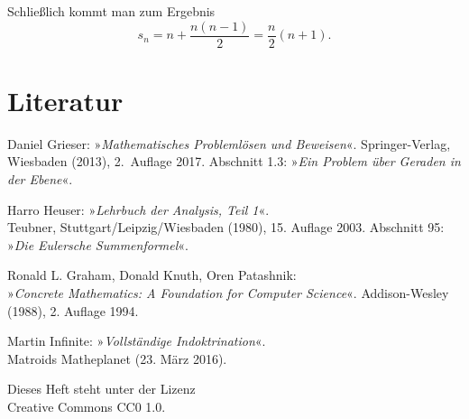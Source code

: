 \documentclass[a4paper,10pt,fleqn,twocolumn,twoside]{scrartcl}
\begin{document}
Schließlich kommt man zum Ergebnis
\[s_n = n + \frac{n(n-1)}{2} = \frac{n}{2}(n+1).\]

\newpage
\section*{Literatur}

\noindent
[1] Daniel Grieser: »\emph{Mathematisches Problemlösen und Beweisen}«.
Springer-Verlag, Wiesbaden (2013),
2.~Auflage 2017.
Abschnitt 1.3: »\emph{Ein Problem über Geraden in der Ebene}«.

\vspace{1em}\noindent
[2] Harro Heuser: »\emph{Lehrbuch der Analysis, Teil 1}«.\\
Teubner, Stuttgart/Leipzig/Wiesbaden (1980),
15. Auflage 2003. Abschnitt 95: »\emph{Die Eulersche Summenformel}«.

\vspace{1em}\noindent
[3] Ronald L. Graham, Donald Knuth, Oren Patashnik:\\
»\emph{Concrete Mathematics: A Foundation for Computer Science}«.
Addison-Wesley (1988), 2. Auflage 1994. 

\vspace{1em}\noindent
[4] Martin Infinite: »\emph{Vollständige Indoktrination}«.\\
Matroids Matheplanet (23. März 2016).

\vfill\noindent
Dieses Heft steht unter der Lizenz\\
Creative Commons CC0 1.0.
\end{document}
